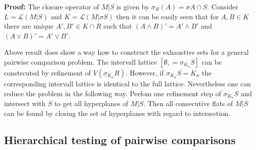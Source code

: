 \documentclass[a4paper,12pt]{article}
\newtheorem{theorem}{Theorem}
\newenvironment{proof}[1][Proof]{\noindent\textbf{#1:} }{}
\begin{document}
\begin{proof}
  The closure operator of $M|S$ is given by $\sigma_R(A) = \sigma A
  \cap S$. Consider $L = \mathcal{L}(M|S)$ and $K = \mathcal{L}(M|\sigma
  S)$ then it can be easily seen that for $A,B \in K$ there are unique $A',B'
  \in K \cap R$ such that $(A \land B)' = A' \land B'$ and $(A
  \lor B)' = A' \lor B'$. 
\end{proof}

Above result does show a way how to construct the exhaustive sets for
a general pairwise comparison problem. The intervall lattice
$[\emptyset,=\sigma_{K_n} S]$ can be constrcuted by refinement of
$V(\sigma_{K_n} R)$.  However, if $\sigma_{K_n} S = K_n$ the
corresponding intervall lattice is identical to the full
lattice. Nevertheless one can reduce the problem in the following
way. Perfom one refinement step of $\sigma_{K_n} S$ and intersect with
$S$ to get all hyperplanes of $M|S$. Then all consecutive flats of
$M|S$ can be found by closing the set of hyperplanes with regard to
intersection.

\subsection{Hierarchical testing of pairwise comparisons}


\end{document}
